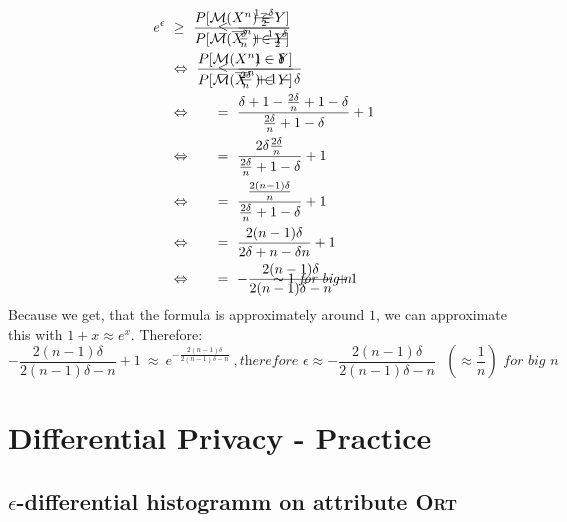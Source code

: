 \documentclass{report}
\begin{document}
		\begin{align*}
			e^{\epsilon} \ & \geq \ \frac{P[\fancyletter{M}(X^n) \in Y]}{P[\fancyletter{M}(\overline{X}^n) \in Y]} \ && \hspace*{-2.5cm} \leq \ \frac{\frac{1-\delta}{2}}{\frac{\delta}{n} + \frac{1 - \delta}{2}} \\
			& \Leftrightarrow \ \frac{P[\fancyletter{M}(X^n) \in Y]}{P[\fancyletter{M}(\overline{X}^n) \in Y]} \ && \hspace*{-2.5cm} \leq \ \frac{1 - \delta}{\frac{2\delta}{n} + 1 - \delta } \\
			& \Leftrightarrow && \hspace*{-2.5cm} = \ \frac{\delta + 1 - \frac{2 \delta}{n} + 1 - \delta}{\frac{2 \delta}{n} + 1 - \delta} + 1 \\
			& \Leftrightarrow && \hspace*{-2.5cm} = \ \frac{2 \delta \frac{2 \delta}{n}}{\frac{2 \delta}{n} + 1 - \delta} + 1 \\
			& \Leftrightarrow && \hspace*{-2.5cm} = \ \frac{\frac{2 (n - 1) \delta}{n}}{\frac{2 \delta}{n} + 1 - \delta} + 1 \\
			& \Leftrightarrow && \hspace*{-2.5cm} = \ \frac{2 (n - 1) \delta}{2 \delta + n - \delta n} + 1 \\
			& \Leftrightarrow && \hspace*{-2.5cm} = \ -\frac{2 (n - 1) \delta}{2 (n-1) \delta - n} + 1 && \hspace*{-3cm} \sim 1 \ \textit{for big $n$}\\
		\end{align*}
		Because we get, that the formula is approximately around $1$, we can approximate this with $1 + x \approx e^x$. Therefore:
		\[
			-\frac{2 (n - 1) \delta}{2 (n-1) \delta - n} + 1 \ \approx \ e^{-\frac{2 (n - 1) \delta}{2 (n-1) \delta - n}} \ ,\textit{therefore $\epsilon \approx -\frac{2 (n - 1) \delta}{2 (n-1) \delta - n}$  $(\approx \frac{1}{n})$ for big $n$}
		\]
	\closesection
	
	\section{Differential Privacy - Practice}
	\startsection
	\renewcommand{\thesubsection}{\thesection.\alph{subsection}}
		\subsection{$\epsilon$-differential histogramm on attribute \textsc{Ort}}
		\startsubsection
\end{document}
